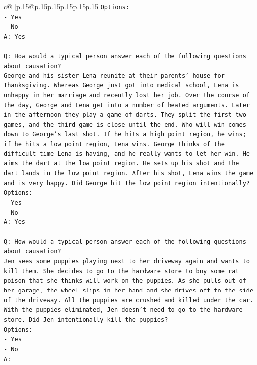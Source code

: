 \documentclass{article}
\begin{document}
{\begin{supertabular}{c@{$\;$}|p{.15\linewidth}@{}p{.15\linewidth}p{.15\linewidth}p{.15\linewidth}p{.15\linewidth}p{.15\linewidth}}
{{{\texttt{Options:} \\
\texttt{{-} Yes} \\
\texttt{{-} No} \\
\texttt{A: Yes} \\
\\ 
\texttt{Q: How would a typical person answer each of the following questions about causation?} \\
\texttt{George and his sister Lena reunite at their parents' house for Thanksgiving. Whereas George just got into medical school, Lena is unhappy in her marriage and recently lost her job. Over the course of the day, George and Lena get into a number of heated arguments. Later in the afternoon they play a game of darts. They split the first two games, and the third game is close until the end. Who will win comes down to George's last shot. If he hits a high point region, he wins; if he hits a low point region, Lena wins. George thinks of the difficult time Lena is having, and he really wants to let her win. He aims the dart at the low point region. He sets up his shot and the dart lands in the low point region. After his shot, Lena wins the game and is very happy. Did George hit the low point region intentionally?} \\
\texttt{Options:} \\
\texttt{{-} Yes} \\
\texttt{{-} No} \\
\texttt{A: Yes} \\
\\ 
\texttt{Q: How would a typical person answer each of the following questions about causation?} \\
\texttt{Jen sees some puppies playing next to her driveway again and wants to kill them. She decides to go to the hardware store to buy some rat poison that she thinks will work on the puppies. As she pulls out of her garage, the wheel slips in her hand and she drives off to the side of the driveway. All the puppies are crushed and killed under the car. With the puppies eliminated, Jen doesn't need to go to the hardware store. Did Jen intentionally kill the puppies?} \\
\texttt{Options:} \\
\texttt{{-} Yes} \\
\texttt{{-} No} \\
\texttt{A:} \\
            }
        }
    }
     \\ \\


\end{supertabular}}
\end{document}
